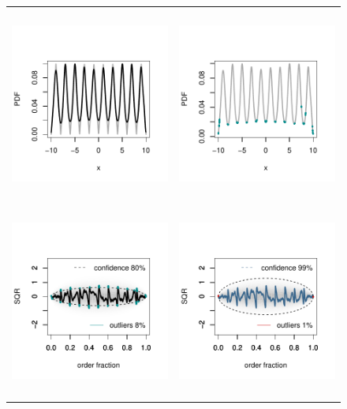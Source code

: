 \begin{figure}[tbp]
\centering
\begin{tabular}{p{}p{}}
  \vspace{0pt} \includegraphics[width=2.2in, height=2.5in]{Figure4a.pdf} &
  \vspace{0pt} \includegraphics[width=2.2in, height=2.5in]{Figure4b.pdf} \\
  \vspace{0pt} \includegraphics[width=2.2in, height=2.5in]{Figure4c.pdf} &
  \vspace{0pt} \includegraphics[width=2.2in, height=2.5in]{Figure4d.pdf} 

\end{tabular}
\end{figure}
